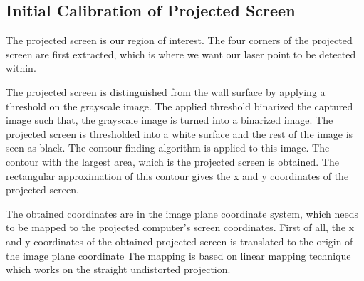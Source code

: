 \documentclass[12pt, a4paper]{article}
\begin{document}
\subsection{Initial Calibration of Projected Screen}
	 The projected screen is our region of interest. The four corners of the projected screen are first extracted, which is where we want our laser point to be detected within. 
	 
    The projected screen is distinguished from the wall surface by applying a threshold on the grayscale image. The applied threshold binarized the captured image such that, the grayscale image is turned into a binarized image. The projected screen is thresholded into a white surface and the rest of the image is seen as black. The contour finding algorithm is applied to this image. The contour with the largest area, which is the projected screen is obtained. The rectangular approximation of this contour gives the x and y coordinates of the projected screen. 
 
    The obtained coordinates are in the image plane coordinate system, which needs to be mapped to the projected computer’s screen coordinates. First of all, the x and y coordinates of the obtained projected screen is translated to the origin of the image plane coordinate 
The mapping is based on linear mapping technique which works on the straight undistorted projection. 
\end{document}
